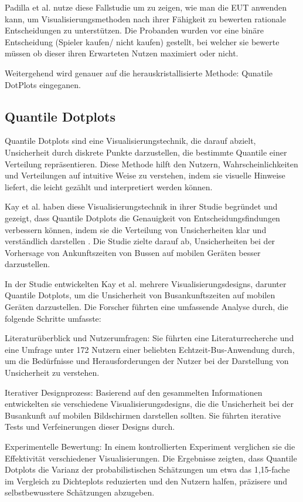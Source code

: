 Padilla et al. nutze diese Fallstudie um zu zeigen, wie man die \ac{EUT} anwenden kann, um Visualisierungsmethoden nach ihrer Fähigkeit zu bewerten
rationale Entscheidungen zu unterstützen. Die Probanden wurden vor eine binäre Entscheidung (Spieler kaufen/ nicht kaufen) gestellt, bei welcher sie bewerte müssen
ob dieser ihren Erwarteten Nutzen maximiert oder nicht. \cite{VisualizationPsychology2023}

Weitergehend wird genauer auf die herauskristallisierte Methode: Qunatile DotPlots eingeganen.

\subsection{Quantile Dotplots}

Quantile Dotplots sind eine Visualisierungstechnik, die darauf abzielt, Unsicherheit durch diskrete Punkte darzustellen, die bestimmte Quantile einer Verteilung repräsentieren. 
Diese Methode hilft den Nutzern, Wahrscheinlichkeiten und Verteilungen auf intuitive Weise zu verstehen, indem sie visuelle Hinweise 
liefert, die leicht gezählt und interpretiert werden können.

Kay et al. haben diese Visualisierungstechnik in ihrer Studie begründet und gezeigt, dass Quantile Dotplots die Genauigkeit von 
Entscheidungsfindungen verbessern können, indem sie die Verteilung von Unsicherheiten klar und verständlich 
darstellen \cite{Kay2016}. Die Studie zielte darauf ab, Unsicherheiten bei der Vorhersage von Ankunftszeiten von Bussen auf 
mobilen Geräten besser darzustellen.

In der Studie entwickelten Kay et al. mehrere Visualisierungsdesigns, darunter Quantile Dotplots, um die Unsicherheit von 
Busankunftszeiten auf mobilen Geräten darzustellen. Die Forscher führten eine umfassende Analyse durch, die folgende Schritte umfasste:

Literaturüberblick und Nutzerumfragen: Sie führten eine Literaturrecherche und eine Umfrage unter 172 Nutzern einer beliebten 
Echtzeit-Bus-Anwendung durch, um die Bedürfnisse und Herausforderungen der Nutzer bei der Darstellung von Unsicherheit zu verstehen.

Iterativer Designprozess: Basierend auf den gesammelten Informationen entwickelten sie verschiedene Visualisierungsdesigns, 
die die Unsicherheit bei der Busankunft auf mobilen Bildschirmen darstellen sollten. Sie führten iterative Tests und Verfeinerungen 
dieser Designs durch.

Experimentelle Bewertung: In einem kontrollierten Experiment verglichen sie die Effektivität verschiedener Visualisierungen. 
Die Ergebnisse zeigten, dass Quantile Dotplots die Varianz der probabilistischen Schätzungen um etwa das 1,15-fache im Vergleich 
zu Dichteplots reduzierten und den Nutzern halfen, präzisere und selbstbewusstere Schätzungen abzugeben.

